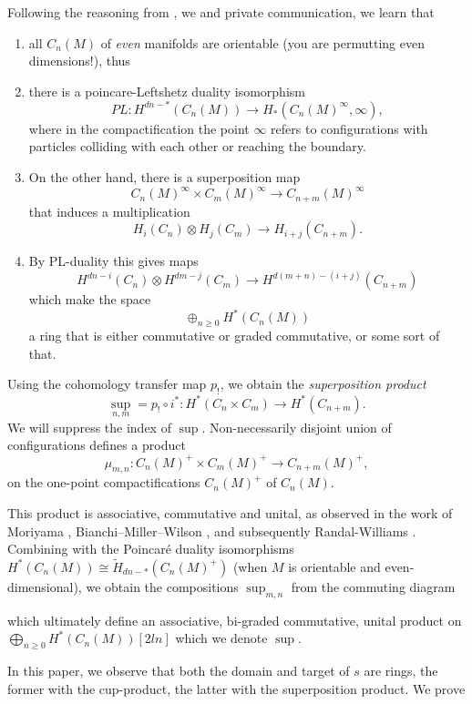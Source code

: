 Following the reasoning from \cite{bianchi2021mapping}, we  and private communication, we learn that 
\begin{enumerate}
    \item all $C_n(M)$ of \textit{even} manifolds are orientable (you are permutting even dimensions!), thus
    
    \item there is a poincare-Leftshetz duality isomorphism
\begin{equation*}
    PL:H^{dn-*}(C_n(M))\to H_*(C_n(M)^{\infty},\infty),
\end{equation*}
    where in the compactification the point $\infty$ refers to configurations with particles colliding with each other or reaching the boundary.

    \item On the other hand, there is a superposition map
    \begin{equation*}
        C_n(M)^{\infty}\times C_{m}(M)^{\infty}\to C_{n+m}(M)^{\infty}
    \end{equation*}
    that induces a multiplication
    \begin{equation*}
        H_i(C_n)\otimes H_j(C_m)\to H_{i+j}(C_{n+m}).
    \end{equation*}
    
    \item By PL-duality this gives maps $$H^{dn-i}(C_n)\otimes H^{dm-j}(C_m)\to H^{d(m+n)-(i+j)}(C_{n+m})$$
    which make the space $$\oplus_{n\ge 0} H^{*}(C_n(M))$$
    a ring that is either commutative or graded commutative, or some sort of that. 
\end{enumerate}



Using the cohomology transfer map $p_!$, we obtain the \textit{superposition product} $${\sup}_{n,m}=p_{!}\circ i^{*}: H^*(C_n\times C_m)\to H^*(C_{n+m}).$$
We will suppress the index of $\sup$.
Non-necessarily disjoint union of configurations defines a product $$\mu_{m,n}:C_n(M)^+\times C_m(M)^+\to C_{n+m}(M)^+,$$
on the one-point compactifications $C_n(M)^{+}$ of $C_n(M)$. 


This product is associative, commutative and unital, as observed in the work of Moriyama \cite{Moriyama}, Bianchi--Miller--Wilson \cite{bianchi2021mapping}, and subsequently Randal-Williams \cite{randalwilliams2023configuration}.
Combining with the Poincar\'e duality isomorphisms $H^{*}(C_n(M))\cong \widetilde{H}_{dn-*}(C_n(M)^{+})$ (when $M$ is orientable and even-dimensional), we obtain the compositions $\sup_{m,n}$ from the commuting diagram
\begin{center}
\end{center}
which ultimately define an associative, bi-graded commutative, unital product on $\bigoplus_{n\ge 0}H^*(C_n(M))[2ln]$ which we denote $\sup$.

In this paper, we observe that both the domain and target of $s$ are rings, the former with the cup-product, the latter with the superposition product. We prove